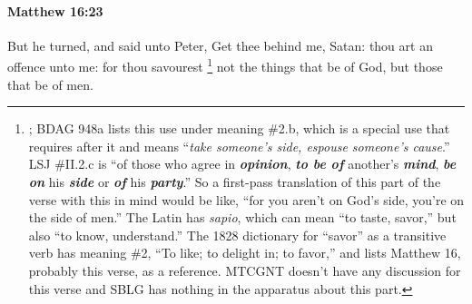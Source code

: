 			\begin{framed}
			\scriptsize
				\begin{compactdesc}
					\item[SBLG] 
				\end{compactdesc}
			\end{framed}

		\paragraph{Matthew 16:23} %
			\label{MATTHEW-16-23}

			But he turned, and said unto Peter, Get thee behind me, Satan: thou art an offence unto me: for thou savourest%
				\footnote{%
					; BDAG 948a lists this use under meaning \#2.b, which is a special use that requires  after it and means ``\textit{take someone's side, espouse someone's cause}.'' LSJ \#II.2.c is ``of those who agree in \textbf{\textit{opinion}},  \textbf{\textit{to be of}} another's \textbf{\textit{mind}}, \textbf{\textit{be on}} his \textbf{\textit{side}} or \textbf{\textit{of}} his \textbf{\textit{party}}.'' So a first-pass translation of this part of the verse with this in mind would be like, ``for you aren't on God's side, you're on the side of men.'' The Latin has \textit{sapio}, which can mean ``to taste, savor,'' but also ``to know, understand.'' The 1828 dictionary for ``savor'' as a transitive verb has meaning \#2, ``To like; to delight in; to favor,'' and lists Matthew 16, probably this verse, as a reference. MTCGNT doesn't have any discussion for this verse and SBLG has nothing in the apparatus about this part.
					}
			not the things that be of God, but those that be of men.

